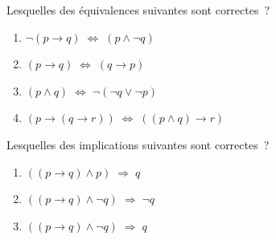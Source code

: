 \documentclass[12pt,french,oneside,a4paper]{memoir} %
\begin{document}
\begin{exo}
  Lesquelles des équivalences suivantes sont correctes~?
  \begin{enumerate}
  \item $\lnot(p \to q) \;\iff\; (p \land \lnot q)$
  \item $(p \to q) \;\iff\; (q \to p)$
  \item $(p \land q) \;\iff\; \lnot(\lnot q \lor \lnot p)$
  \item $(p \to (q \to r)) \;\iff\; ((p \land q) \to r)$
  \end{enumerate}
\end{exo}


\begin{exo}
Lesquelles des implications suivantes sont correctes~?
\begin{enumerate}
\item $((p \to q) \land p) \;\Rightarrow\; q$
\item $((p \to q) \land \lnot q) \;\Rightarrow\; \lnot q$
\item $((p \to q) \land \lnot q) \;\Rightarrow\;  q$
\end{enumerate}
\end{exo}
\end{document}
